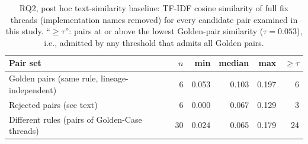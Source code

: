 \begin{table}[b]
\caption{RQ2, post hoc text-similarity baseline: TF-IDF cosine similarity of full fix threads (implementation names
removed) for every candidate pair examined in this study. ``$\geq\tau$'': pairs at or above the lowest Golden-pair
similarity ($\tau=0.053$), i.e., admitted by any threshold that admits all Golden pairs.}\label{tab:baseline}
\footnotesize
\begin{tabular}{@{}lrrrrr@{}}\toprule
Pair set & $n$ & min & median & max & $\geq\tau$ \\ \midrule
Golden pairs (same rule, lineage-independent) & 6 & 0.053 & 0.103 & 0.197 & 6 \\
Rejected pairs (see text) & 6 & 0.000 & 0.067 & 0.129 & 3 \\
Different rules (pairs of Golden-Case threads) & 30 & 0.024 & 0.065 & 0.179 & 24 \\
\bottomrule
\end{tabular}
\end{table}
